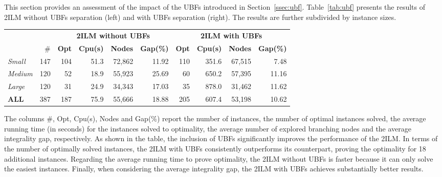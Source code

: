 \documentclass[11pt]{article}
\theoremstyle{definition}
\begin{document}
This section provides an assessment of the impact of the UBFs introduced in Section~\ref{ssec:ubf}. Table~\ref{tab:ubf} presents the results of 2ILM without UBFs separation (left) and with UBFs separation (right). %
The results are further subdivided by instance sizes.

\begin{center}
\begin{tabular}{lrrrrrrrrr}
\toprule
  & & \multicolumn{4}{c}{\textbf{2ILM without UBFs}}  & \multicolumn{4}{c}{\textbf{2ILM with UBFs}}  \\ \vspace*{1pt}
  &  \# & \textbf{Opt} & \textbf{Cpu(s)} & \textbf{Nodes} & \textbf{Gap(\%)} & \textbf{Opt} & \textbf{Cpu(s)} & \textbf{Nodes} & \textbf{Gap(\%)} \\ \cmidrule(r){1-2} \cmidrule(lr){3-6} \cmidrule(l){7-10}
\emph{Small}  & 147 & 104  & 51.3 & 72,862 & 11.92  & 110  & 351.6  & 67,515  & 7.48 \\
\emph{Medium} & 120 & 52 & 18.9 & 55,923 & 25.69  & 60 & 650.2  & 57,395  & 11.16  \\
\emph{Large}  & 120 & 31 & 24.9 & 34,343 & 17.03 & 35 & 878.0  & 31,462  & 11.62  \\ \cmidrule(r){1-2} \cmidrule(lr){3-6} \cmidrule(l){7-10}
\textbf{ALL}  & 387 & 187  & 75.9 & 55,666 & 18.88  & 205  & 607.4  & 53,198  & 10.62  \\ \bottomrule
\end{tabular}
\label{tab:ubf}
\end{center}

The columns \#, Opt, Cpu(s), Nodes and Gap(\%) report the number of instances, the number of optimal instances solved, the average running time (in seconds) for the instances solved to optimality, the average number of explored branching nodes and the average integrality gap, respectively.
%
As shown in the table, the inclusion of UBFs significantly improves the performance of the 2ILM. In terms of the number of optimally solved instances, the 2ILM with UBFs consistently outperforms its counterpart, proving the optimality for 18 additional instances. Regarding the average running time to prove optimality, the 2ILM without UBFs is faster because it can only solve the easiest instances. Finally, when considering the average integrality gap, the 2ILM with UBFs achieves substantially better results.
\end{document}
